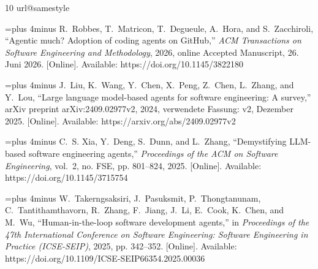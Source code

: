 \documentclass[conference]{IEEEtran}
\begin{document}
\begin{thebibliography}{10}
\providecommand{\url}[1]{#1}
\csname url@samestyle\endcsname
\providecommand{\newblock}{\relax}
\providecommand{\bibinfo}[2]{#2}
\providecommand{\BIBentrySTDinterwordspacing}{\spaceskip=0pt\relax}
\providecommand{\BIBentryALTinterwordstretchfactor}{4}
\providecommand{\BIBentryALTinterwordspacing}{\spaceskip=\fontdimen2\font plus
\BIBentryALTinterwordstretchfactor\fontdimen3\font minus
  \fontdimen4\font\relax}
\providecommand{\BIBforeignlanguage}[2]{{%
\expandafter\ifx\csname l@#1\endcsname\relax
\typeout{** WARNING: IEEEtran.bst: No hyphenation pattern has been}%
\typeout{** loaded for the language `#1'. Using the pattern for}%
\typeout{** the default language instead.}%
\else
\language=\csname l@#1\endcsname
\fi
#2}}
\providecommand{\BIBdecl}{\relax}
\BIBdecl

\BIBentryALTinterwordspacing
R.~Robbes, T.~Matricon, T.~Degueule, A.~Hora, and S.~Zacchiroli, ``Agentic
  much? {Adoption} of coding agents on {GitHub},'' \emph{ACM Transactions on
  Software Engineering and Methodology}, 2026, online Accepted Manuscript, 26.
  Juni 2026. [Online]. Available: \url{https://doi.org/10.1145/3822180}
\BIBentrySTDinterwordspacing

\BIBentryALTinterwordspacing
J.~Liu, K.~Wang, Y.~Chen, X.~Peng, Z.~Chen, L.~Zhang, and Y.~Lou, ``Large
  language model-based agents for software engineering: A survey,'' arXiv
  preprint arXiv:2409.02977v2, 2024, verwendete Fassung: v2, Dezember 2025.
  [Online]. Available: \url{https://arxiv.org/abs/2409.02977v2}
\BIBentrySTDinterwordspacing

\BIBentryALTinterwordspacing
C.~S. Xia, Y.~Deng, S.~Dunn, and L.~Zhang, ``Demystifying {LLM}-based software
  engineering agents,'' \emph{Proceedings of the ACM on Software Engineering},
  vol.~2, no. FSE, pp. 801--824, 2025. [Online]. Available:
  \url{https://doi.org/10.1145/3715754}
\BIBentrySTDinterwordspacing

\BIBentryALTinterwordspacing
W.~Takerngsaksiri, J.~Pasuksmit, P.~Thongtanunam, C.~Tantithamthavorn,
  R.~Zhang, F.~Jiang, J.~Li, E.~Cook, K.~Chen, and M.~Wu, ``Human-in-the-loop
  software development agents,'' in \emph{Proceedings of the 47th International
  Conference on Software Engineering: Software Engineering in Practice
  (ICSE-SEIP)}, 2025, pp. 342--352. [Online]. Available:
  \url{https://doi.org/10.1109/ICSE-SEIP66354.2025.00036}
\BIBentrySTDinterwordspacing


\end{thebibliography}
\end{document}

